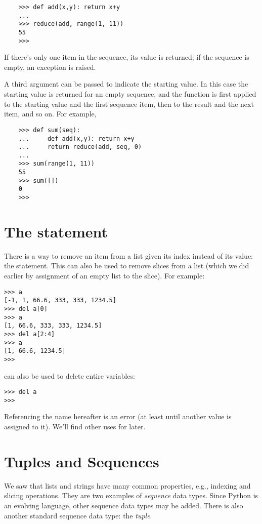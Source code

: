 \begin{verbatim}
    >>> def add(x,y): return x+y
    ...
    >>> reduce(add, range(1, 11))
    55
    >>> 
\end{verbatim}

If there's only one item in the sequence, its value is returned; if
the sequence is empty, an exception is raised.

A third argument can be passed to indicate the starting value.  In this
case the starting value is returned for an empty sequence, and the
function is first applied to the starting value and the first sequence
item, then to the result and the next item, and so on.  For example,

\begin{verbatim}
    >>> def sum(seq):
    ...     def add(x,y): return x+y
    ...     return reduce(add, seq, 0)
    ... 
    >>> sum(range(1, 11))
    55
    >>> sum([])
    0
    >>> 
\end{verbatim}

\section{The  statement}

There is a way to remove an item from a list given its index instead
of its value: the  statement.  This can also be used to
remove slices from a list (which we did earlier by assignment of an
empty list to the slice).  For example:

\bcode\begin{verbatim}
>>> a
[-1, 1, 66.6, 333, 333, 1234.5]
>>> del a[0]
>>> a
[1, 66.6, 333, 333, 1234.5]
>>> del a[2:4]
>>> a
[1, 66.6, 1234.5]
>>>
\end{verbatim}\ecode
%
 can also be used to delete entire variables:

\bcode\begin{verbatim}
>>> del a
>>>
\end{verbatim}\ecode
%
Referencing the name  hereafter is an error (at least until
another value is assigned to it).  We'll find other uses for 
later.

\section{Tuples and Sequences}

We saw that lists and strings have many common properties, e.g.,
indexing and slicing operations.  They are two examples of
\emph{sequence} data types.  Since Python is an evolving language,
other sequence data types may be added.  There is also another
standard sequence data type: the \emph{tuple}.

